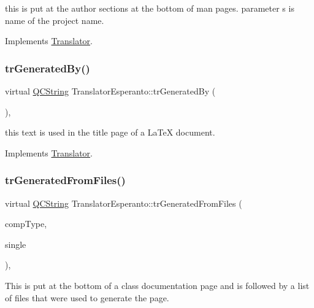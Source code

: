 this is put at the author sections at the bottom of man pages. parameter s is name of the project name. 

Implements \mbox{\hyperlink{class_translator}{Translator}}.

\mbox{\label{class_translator_esperanto_a54dbf82638c95258f87b06c4722d2c30}} 
\subsubsection{\texorpdfstring{trGeneratedBy()}{trGeneratedBy()}}
{\footnotesize\ttfamily virtual \mbox{\hyperlink{class_q_c_string}{Q\+C\+String}} Translator\+Esperanto\+::tr\+Generated\+By (\begin{DoxyParamCaption}{ }\end{DoxyParamCaption})\hspace{0.3cm}{\ttfamily [inline]}, {\ttfamily [virtual]}}

this text is used in the title page of a La\+TeX document. 

Implements \mbox{\hyperlink{class_translator}{Translator}}.

\mbox{\label{class_translator_esperanto_a8abbc306ce28a8af6bb66f359bae833c}} 
\subsubsection{\texorpdfstring{trGeneratedFromFiles()}{trGeneratedFromFiles()}}
{\footnotesize\ttfamily virtual \mbox{\hyperlink{class_q_c_string}{Q\+C\+String}} Translator\+Esperanto\+::tr\+Generated\+From\+Files (\begin{DoxyParamCaption}\item[{\mbox{\hyperlink{class_class_def_ae70cf86d35fe954a94c566fbcfc87939}{Class\+Def\+::\+Compound\+Type}}}]{comp\+Type,  }\item[{bool}]{single }\end{DoxyParamCaption})\hspace{0.3cm}{\ttfamily [inline]}, {\ttfamily [virtual]}}

This is put at the bottom of a class documentation page and is followed by a list of files that were used to generate the page. 

